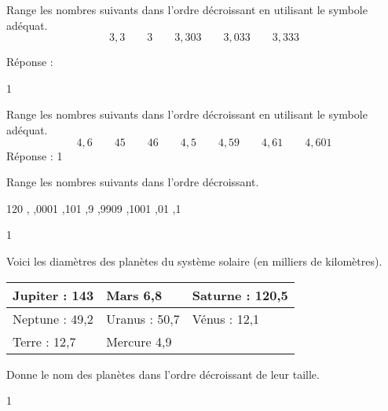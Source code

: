 \documentclass[a4paper,11pt]{report}
\begin{document}
\begin{exop}{
Range les nombres suivants dans l'ordre décroissant en utilisant le symbole adéquat.
\[3,3 \quad  \quad  3 \quad  \quad 3,303  \quad  \quad 3,033  \quad  \quad 3,333 \]

Réponse :\hrulefill
}{1}\end{exop}

\begin{exop}{
Range les nombres suivants dans l'ordre décroissant en utilisant le symbole adéquat.
\[4,6 \quad  \quad 45 \quad  \quad 46 \quad  \quad 4,5 \quad  \quad 4,59 \quad  \quad 4,61 \quad  \quad 4,601 \]
Réponse : \hrulefill
}{1}\end{exop}



\begin{exo}{
Range les nombres suivants dans l'ordre décroissant.
\begin{center}
120 \quad  {}, \quad  {},0001 \quad  {},101 \quad  {},9 \quad  {}  \quad  {},9909 \quad  {},1001 \quad  {},01 \quad  {},1 
\end{center}
}{1}\end{exo}

\begin{exo}{
Voici les diamètres des planètes du système solaire (en milliers de kilomètres).

\begin{center}
\begin{tabular}{|p{4.5cm}|p{4.5cm}|p{4.5cm}|}\hline
Jupiter : 143 & Mars 6,8 & Saturne : 120,5 \\\hline
Neptune : 49,2 & Uranus : 50,7 & Vénus : 12,1 \\\hline
Terre : 12,7 & Mercure 4,9 & \\\hline
\end{tabular}
\end{center}
Donne le nom des planètes dans l'ordre décroissant de leur taille.

}{1}\end{exo}
\end{document}
